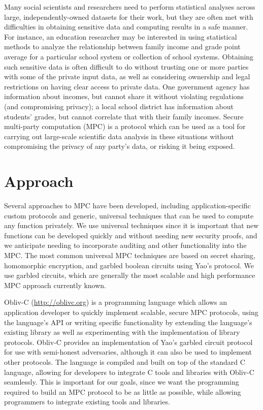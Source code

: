 \documentclass[conference]{IEEEtran}
\begin{document}
Many social scientists and researchers need to perform statistical
analyses across large, independently-owned datasets for their work, but
they are often met with difficulties in obtaining sensitive data and
computing results in a safe manner.  For instance, an education
researcher may be interested in using statistical methods to analyze the
relationship between family income and grade point average for a
particular school system or collection of school systems.  Obtaining
such sensitive data is often difficult to do without trusting one or
more parties with some of the private input data, as well as considering
ownership and legal restrictions on having clear access to private data.
One government agency has information about incomes, but cannot share it
without violating regulations (and compromising privacy); a local school
district has information about students' grades, but cannot correlate
that with their family incomes.  Secure multi-party computation (MPC) is
a protocol which can be used as a tool for carrying out large-scale
scientific data analysis in these situations without compromising the
privacy of any party's data, or risking it being exposed.

\section{Approach}

Several approaches to MPC have been developed, including
application-specific custom protocols and generic, universal techniques
that can be used to compute any function privately.  We use universal
techniques since it is important that new functions can be developed
quickly and without needing new security proofs, and we anticipate
needing to incorporate auditing and other functionality into the MPC.
The most common universal MPC techniques are based on secret sharing,
homomorphic encryption, and garbled boolean circuits using Yao's
protocol.  We use garbled circuits, which are generally the most
scalable and high performance MPC approach currently known.

Obliv-C (\url{http://oblivc.org}) is a programming language which allows
an application developer to quickly implement scalable, secure MPC
protocols, using the language's API or writing specific functionality by
extending the language's existing library as well as experimenting with
the implementation of library protocols\cite{cryptoeprint:2015:1153}.
Obliv-C provides an implementation of Yao's garbled circuit protocol for
use with semi-honest adversaries, although it can also be used to
implement other protocols.  The language is compiled and built on top of
the standard C language, allowing for developers to integrate C tools
and libraries with Obliv-C seamlessly.  This is important for our goals,
since we want the programming required to build an MPC protocol to be as
little as possible, while allowing programmers to integrate existing
tools and libraries.
\end{document}
